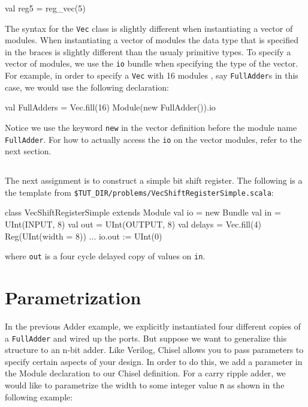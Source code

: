 \begin{scala}
val reg5 = reg_vec(5)
\end{scala}

The syntax for the \verb+Vec+ class is slightly different when instantiating a vector of modules. When instantiating a vector of modules the data type that is specified in the {} braces is slightly different than the usualy primitive types. To specify a vector of modules, we use the \verb+io+ bundle when specifying the type of the vector. For example, in order to specify a \verb+Vec+ with 16 modules , say \verb+FullAdder+s in this case, we would use the following declaration:

\begin{scala}
val FullAdders = 
  Vec.fill(16){ Module(new FullAdder()).io }
\end{scala}

Notice we use the keyword \verb+new+ in the vector definition before the module name \verb+FullAdder+. For how to actually access the \verb+io+ on the vector modules, refer to the next section.

\subsection{}

The next assignment is to construct a simple bit shift register.
The following is a the template from \verb+$TUT_DIR/problems/VecShiftRegisterSimple.scala+:

\begin{scala}
class VecShiftRegisterSimple extends Module {
  val io = new Bundle {
    val in  = UInt(INPUT,  8)
    val out = UInt(OUTPUT, 8)
  }
  val delays = Vec.fill(4){ Reg(UInt(width = 8)) }
  ...
  io.out := UInt(0)
}
\end{scala}

\noindent
where \verb+out+ is a four cycle delayed copy of values on \verb+in+.

\section{Parametrization}

In the previous Adder example, we explicitly instantiated four different copies of a \verb+FullAdder+ and wired up the ports. But suppose we want to generalize this structure to an n-bit adder. Like Verilog, Chisel allows you to pass parameters to specify certain aspects of your design. In order to do this, we add a parameter in the Module declaration to our Chisel definition.
For a carry ripple adder, we would like to parametrize the width to some integer value \verb+n+ as shown in the following example:

